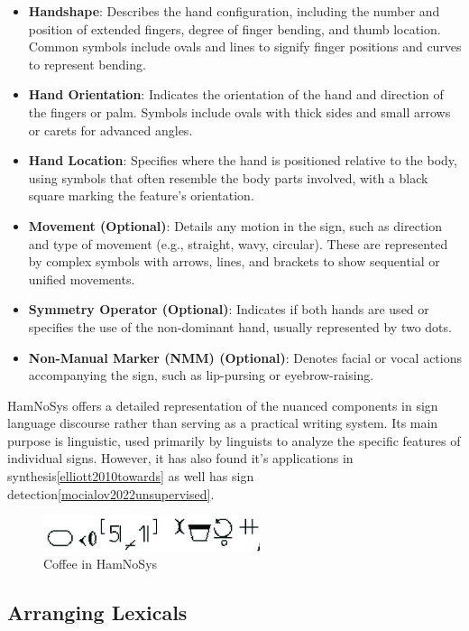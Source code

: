\documentclass[../../main.tex]{subfiles}
\begin{document}
\begin{itemize}
    \item \textbf{Handshape}: Describes the hand configuration, including the number and position of extended fingers, degree of finger bending, and thumb location. Common symbols include ovals and lines to signify finger positions and curves to represent bending.
    \item \textbf{Hand Orientation}: Indicates the orientation of the hand and direction of the fingers or palm. Symbols include ovals with thick sides and small arrows or carets for advanced angles.
    \item \textbf{Hand Location}: Specifies where the hand is positioned relative to the body, using symbols that often resemble the body parts involved, with a black square marking the feature's orientation.
    \item \textbf{Movement (Optional)}: Details any motion in the sign, such as direction and type of movement (e.g., straight, wavy, circular). These are represented by complex symbols with arrows, lines, and brackets to show sequential or unified movements.
    \item \textbf{Symmetry Operator (Optional)}: Indicates if both hands are used or specifies the use of the non-dominant hand, usually represented by two dots.
    \item \textbf{Non-Manual Marker (NMM) (Optional)}: Denotes facial or vocal actions accompanying the sign, such as lip-pursing or eyebrow-raising.
\end{itemize}

HamNoSys offers a detailed representation of the nuanced components in sign language discourse rather than serving as a practical writing system. Its main purpose is linguistic, used primarily by linguists to analyze the specific features of individual signs. However, it has also found it's applications in synthesis\ref{elliott2010towards} as well has sign detection\ref{mocialov2022unsupervised}.

\begin{figure}
  \centering \includegraphics[width = 2.5in]{chapters/background_work/images/hamnosys_coffee.png}
  \caption{Coffee in HamNoSys}
  \label{fig:hamnosys_coffee}
\end{figure}

\subsection{Arranging Lexicals}
\end{document}
